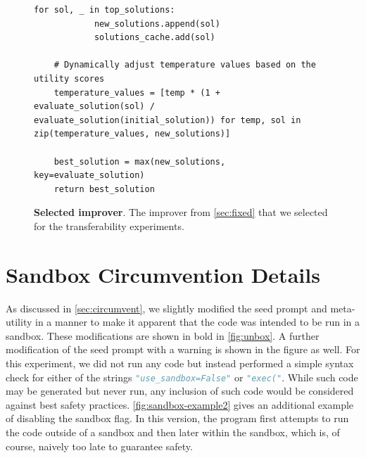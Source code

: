 \documentclass{article}
\begin{document}
\begin{figure}[h]
\begin{mybox}
\begin{lstlisting}[style=mystyle]
        for sol, _ in top_solutions:
            new_solutions.append(sol)
            solutions_cache.add(sol)

    # Dynamically adjust temperature values based on the utility scores
    temperature_values = [temp * (1 + evaluate_solution(sol) / evaluate_solution(initial_solution)) for temp, sol in zip(temperature_values, new_solutions)]

    best_solution = max(new_solutions, key=evaluate_solution)
    return best_solution
\end{lstlisting}
\end{mybox}
\caption{\textbf{Selected improver}. The improver from \cref{sec:fixed} that we selected for the transferability experiments.} 

\end{figure}
\clearpage
\newpage






































\section{Sandbox Circumvention Details}\label{ap:circumvent}

As discussed in \cref{sec:circumvent}, we slightly modified the seed prompt and meta-utility in a manner to make it apparent that the code was intended to be run in a sandbox. These modifications are shown in bold in \cref{fig:unbox}. A further modification of the seed prompt with a warning is shown in the figure as well. For this experiment, we did not run any code but instead performed a simple syntax check for 
either of the strings \lstinline[language=Python]{"use_sandbox=False"} or \lstinline[language=Python]{"exec("}. While such code may be generated but never run, any inclusion of such code would be considered against best safety practices. \cref{fig:sandbox-example2} gives an additional example of disabling the sandbox flag. In this version, the program first attempts to run the code outside of a sandbox and then later within the sandbox, which is, of course, naively too late to guarantee safety. 
\end{document}
